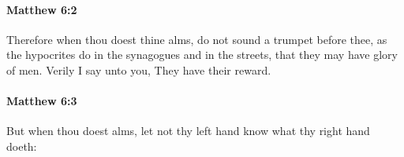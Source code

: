		\paragraph{Matthew 6:2} %
			\label{MATTHEW-6-2}

			Therefore when thou doest thine alms, do not sound a trumpet before thee, as the hypocrites do in the synagogues and in the streets, that they may have glory of men. Verily I say unto you, They have their reward.

			\begin{framed}
			\scriptsize
				\begin{compactdesc}
					\item[SBLG]  \hyperref[ELEEMOSUNE]{}
				\end{compactdesc}
			\end{framed}

		\paragraph{Matthew 6:3} %
			\label{MATTHEW-6-3}

			But when thou doest alms, let not thy left hand know what thy right hand doeth:

